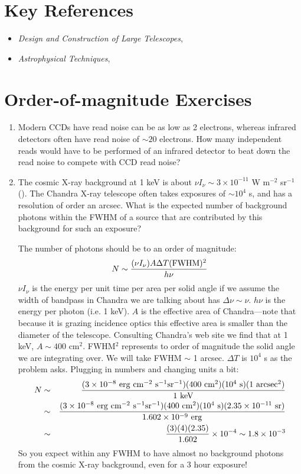 \section{Key References}

\begin{itemize}
  \item
    {\it Design and Construction of Large Telescopes},
      \citet{bely03a}
  \item
    {\it Astrophysical Techniques},
      \citet{kitchin09a}
\end{itemize}

\section{Order-of-magnitude Exercises}

\begin{enumerate} 
\item Modern CCDs have read noise can be as low as 2 electrons,
    whereas infrared detectors often have read noise of $\sim 20$
    electrons. How many independent reads would have to be performed
    of an infrared detector to beat down the read noise to compete
    with CCD read noise?
\item The cosmic X-ray background at 1 keV is about $\nu I_\nu \sim
    3\times 10^{-11}$
    W m$^{-2}$ sr$^{-1}$ (\citealt{fabian92a}). The Chandra X-ray
    telescope often takes exposures of $\sim 10^4$ s, and has a
    resolution of order an arcsec. What is the expected number of
    background photons within the FWHM of a source that are
    contributed by this background for such an exposure?
\begin{answer}[]
The number of photons should be to an order of magnitude:
\begin{equation}
N \sim \frac{(\nu I_\nu) A \Delta T ({\rm FWHM})^2}{h\nu}
\end{equation}
$\nu I_\nu$ is the energy per unit time per area per solid angle if we
assume the width of bandpass in Chandra we are talking about has
$\Delta \nu \sim \nu$. $h\nu$ is the energy per photon (i.e. 1 keV).
$A$ is the effective area of Chandra---note that because it is grazing
incidence optics this effective area is smaller than the diameter of
the telescope. Consulting Chandra's web site we find that at 1 keV,
$A\sim 400$ cm$^2$.  FWHM$^2$ represents to order of magnitude the
solid angle we are integrating over. We will take FWHM $\sim$ 1
arcsec.  $\Delta T$ is $10^4$ s as the problem asks.
Plugging in numbers and changing units a bit:
\begin{eqnarray}
N &\sim& \frac{(3\times 10^{-8} {\rm ~erg} {\rm ~cm}^{-2} {\rm ~s}^{-1}
{\rm sr}^{-1}) (400 {\rm ~cm}^2) (10^4 {\rm ~s}) (1 {\rm
~arcsec}^2)}{1 {\rm ~keV}}\cr
&\sim& \frac{(3\times 10^{-8} {\rm ~erg} {\rm ~cm}^{-2} {\rm ~s}^{-1}
{\rm sr}^{-1}) (400 {\rm ~cm}^2) (10^4 {\rm ~s}) (2.35\times 10^{-11} {\rm
~sr})}{1.602\times 10^{-9} {\rm ~erg}}\cr
&\sim& \frac{(3) (4) (2.35)}{1.602} \times 10^{-4} \sim 1.8 \times
10^{-3}
\end{eqnarray}
So you expect within any FWHM to have almost no background photons
from the cosmic X-ray background, even for a 3 hour exposure!
\end{answer}


\end{enumerate}
